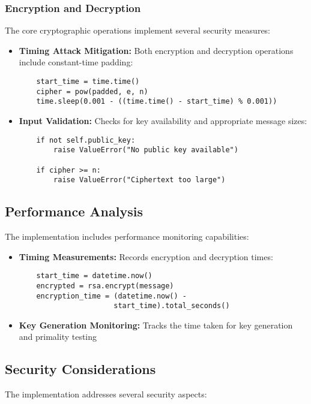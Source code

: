 \documentclass[12pt]{article}
\begin{document}
\subsubsection{Encryption and Decryption}
The core cryptographic operations implement several security measures:

\begin{itemize}
    \item \textbf{Timing Attack Mitigation:} Both encryption and decryption operations include constant-time padding:
    \begin{verbatim}
    start_time = time.time()
    cipher = pow(padded, e, n)
    time.sleep(0.001 - ((time.time() - start_time) % 0.001))
    \end{verbatim}
    
    \item \textbf{Input Validation:} Checks for key availability and appropriate message sizes:
    \begin{verbatim}
    if not self.public_key:
        raise ValueError("No public key available")
        
    if cipher >= n:
        raise ValueError("Ciphertext too large")
    \end{verbatim}
\end{itemize}

\subsection{Performance Analysis}
The implementation includes performance monitoring capabilities:

\begin{itemize}
    \item \textbf{Timing Measurements:} Records encryption and decryption times:
    \begin{verbatim}
    start_time = datetime.now()
    encrypted = rsa.encrypt(message)
    encryption_time = (datetime.now() - 
                      start_time).total_seconds()
    \end{verbatim}
    
    \item \textbf{Key Generation Monitoring:} Tracks the time taken for key generation and primality testing
\end{itemize}

\subsection{Security Considerations}
The implementation addresses several security aspects:
\end{document}
